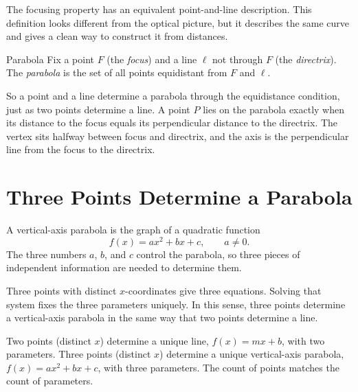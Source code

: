 \documentclass[12pt]{book}
\begin{document}
The focusing property has an equivalent point-and-line description. This definition
looks different from the optical picture, but it describes the same curve and gives a
clean way to construct it from distances.
\begin{definition}{Parabola}
Fix a point $F$ (the \emph{focus}) and a line $\ell$ not through $F$ (the
\emph{directrix}). The \emph{parabola} is the set of all points equidistant from $F$
and $\ell$.
\end{definition}

So a point and a line determine a parabola through the equidistance condition, just
as two points determine a line. A point $P$ lies on the parabola exactly when its
distance to the focus equals its perpendicular distance to the directrix. The vertex
sits halfway between focus and directrix, and the axis is the perpendicular line from
the focus to the directrix.
\begin{center}
\end{center}

\section{Three Points Determine a Parabola}

A vertical-axis parabola is the graph of a quadratic function
\[
f(x)=ax^2+bx+c,\qquad a\neq 0.
\]
The three numbers $a$, $b$, and $c$ control the parabola, so three pieces of
independent information are needed to determine them.

Three points with distinct $x$-coordinates give three equations. Solving that system
fixes the three parameters uniquely. In this sense, three points determine a
vertical-axis parabola in the same way that two points determine a line.
\begin{keyidea}
Two points (distinct $x$) determine a unique line, $f(x)=mx+b$, with two parameters.
Three points (distinct $x$) determine a unique vertical-axis parabola,
$f(x)=ax^2+bx+c$, with three parameters. The count of points matches the count of
parameters.
\end{keyidea}
\end{document}
